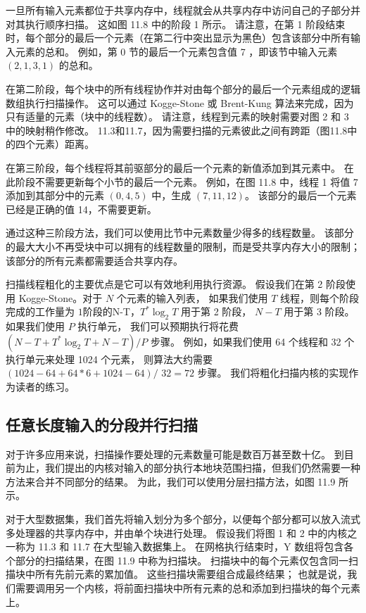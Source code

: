 一旦所有输入元素都位于共享内存中，线程就会从共享内存中访问自己的子部分并对其执行顺序扫描。 这如图 11.8 中的阶段 1 所示。 
请注意，在第 1 阶段结束时，每个部分的最后一个元素（在第二行中突出显示为黑色）包含该部分中所有输入元素的总和。 
例如，第 0 节的最后一个元素包含值 7 ，即该节中输入元素 $(2,1,3,1)$ 的总和。

在第二阶段，每个块中的所有线程协作并对由每个部分的最后一个元素组成的逻辑数组执行扫描操作。 
这可以通过 Kogge-Stone 或 Brent-Kung 算法来完成，因为只有适量的元素（块中的线程数）。 
请注意，线程到元素的映射需要对图 2 和 3 中的映射稍作修改。 
11.3和11.7，因为需要扫描的元素彼此之间有跨距（图11.8中的四个元素）距离。

在第三阶段，每个线程将其前驱部分的最后一个元素的新值添加到其元素中。 在此阶段不需要更新每个小节的最后一个元素。 
例如，在图 11.8 中，线程 1 将值 7 添加到其部分中的元素 $(0,4,5)$ 中，生成 $(7,11,12)$。 
该部分的最后一个元素已经是正确的值 14，不需要更新。

通过这种三阶段方法，我们可以使用比节中元素数量少得多的线程数量。 
该部分的最大大小不再受块中可以拥有的线程数量的限制，而是受共享内存大小的限制； 该部分的所有元素都需要适合共享内存。

扫描线程粗化的主要优点是它可以有效地利用执行资源。 假设我们在第 2 阶段使用 Kogge-Stone。对于 $N$ 个元素的输入列表，
如果我们使用 $T$ 线程，则每个阶段完成的工作量为 $1 阶段的 $N-T$，T^{*} \log _{2} T$ 用于第 2 阶段，
$N-T$ 用于第 3 阶段。 如果我们使用 $P$ 执行单元，
我们可以预期执行将花费 $\left(N-T+T^{*} \log _{2} T+N-T\right) / P$ 步骤。 
例如，如果我们使用 64 个线程和 32 个执行单元来处理 1024 个元素，
则算法大约需要 $(1024-64+64 * 6+1024-64) /$ $32=72$ 步骤。 我们将粗化扫描内核的实现作为读者的练习。

\subsection{任意长度输入的分段并行扫描}
对于许多应用来说，扫描操作要处理的元素数量可能是数百万甚至数十亿。 
到目前为止，我们提出的内核对输入的部分执行本地块范围扫描，但我们仍然需要一种方法来合并不同部分的结果。 
为此，我们可以使用分层扫描方法，如图 11.9 所示。

对于大型数据集，我们首先将输入划分为多个部分，以便每个部分都可以放入流式多处理器的共享内存中，并由单个块进行处理。 
假设我们将图 1 和 2 中的内核之一称为 11.3 和 11.7 在大型输入数据集上。 
在网格执行结束时，$\mathrm{Y}$ 数组将包含各个部分的扫描结果，在图 11.9 中称为扫描块。 
扫描块中的每个元素仅包含同一扫描块中所有先前元素的累加值。 
这些扫描块需要组合成最终结果； 也就是说，我们需要调用另一个内核，将前面扫描块中所有元素的总和添加到扫描块的每个元素上。

